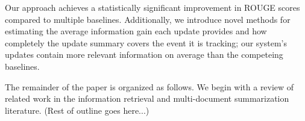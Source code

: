 Our approach achieves a statistically significant improvement in 
 ROUGE scores compared to multiple baselines.
Additionally, we introduce novel methods for estimating the average information
gain each update provides and how completely the update summary covers 
the event it is tracking; our system's updates contain more relevant
information on average than the competeing baselines.


The remainder of the paper is organized as follows.
We begin with a review of related work
in the information retrieval and multi-document
summarization literature. (Rest of outline goes here...)




